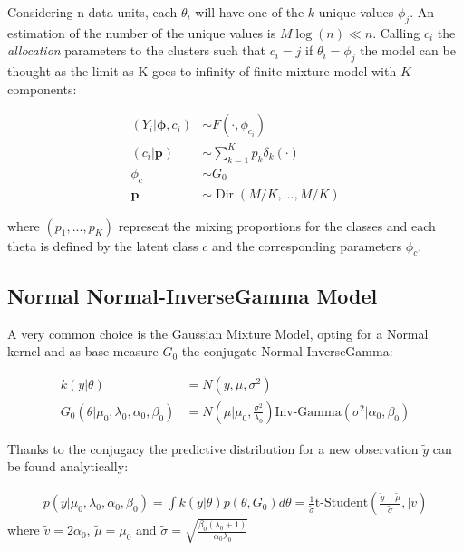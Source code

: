 Considering n data units, each $\theta_i$ will have one of the $k$ unique values $\phi_{j}$. An estimation of the number of the unique values is $M\log(n) \ll n$. Calling  $c_i$ the \textit{allocation} parameters to the clusters such that $c_i = j$ if $\theta_i = \phi_j$ the model can be thought as the limit as K goes to infinity of
finite mixture model with $K$ components:

\begin{align*}
            	(Y_{i}|\mathbf{\phi},c_{i})&\sim F(\cdot,\phi_{c_{i}}) \\
            	(c_{i}|\mathit{\mathbf{p}})&\sim \sum_{k=1}^K\mathit{p_k} \delta_k(\cdot) \\
            	\phi_{c} & \sim G_{0} \\
            	\mathbf{p} &\sim \operatorname{Dir}(M/K,\dots,M/K)
\end{align*}
        

where $(p_1,...,p_K)$ represent the mixing proportions for the classes and each theta is defined by the latent class $c$ and the corresponding parameters $\phi_c$.


\subsection{Normal Normal-InverseGamma Model}
A very common choice is the Gaussian Mixture Model, opting for a Normal kernel and as base measure $G_0$ the conjugate Normal-InverseGamma:

\begin{align*}
            	k(y|\theta)&=N(y, \mu ,\sigma^2)  \\
            	G_0(\theta|\mu_0,\lambda_0, \alpha_0, \beta_0)&=N\left(\mu | \mu_0 ,\frac{\sigma^2} {\lambda_0}\right)\text{Inv-Gamma}(\sigma^2|\alpha_0, \beta_0 )
\end{align*}

Thanks to the conjugacy the predictive distribution for a new observation $\widetilde{y}$ can be found analytically:

\begin{align}
      p(\widetilde{y}|\mu_0,\lambda_0, \alpha_0, \beta_0)= \int k(\widetilde{y}|\theta)p(\theta, G_0)d\theta= \frac{1}{\widetilde{\sigma}} \text{t-Student}\left(\frac{\widetilde{y}-\widetilde{\mu}}{\widetilde{\sigma}} ,|\widetilde{v}\right)        	
\end{align}
where $\widetilde{v}=2 \alpha_0$, $\widetilde{\mu}=\mu_0$ and $\widetilde{\sigma}= \sqrt{\frac{\beta_0(\lambda_0+1)}{\alpha_0 \lambda_0}} $

